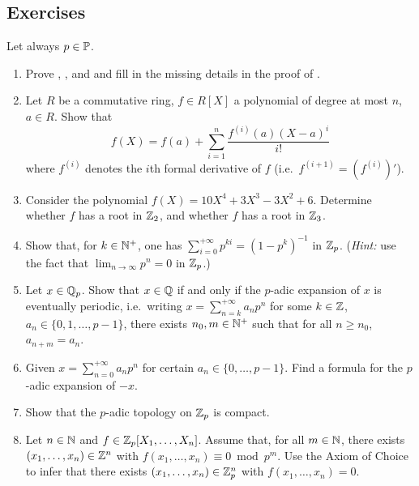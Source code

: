 \documentclass[12pt, leqno, british]{amsart}
\begin{document}
\subsection{Exercises}
Let always $p \in \mathbb P$.
\begin{enumerate}
\item Prove , , and  and fill in the missing details in the proof of .
\item\label{ex:formal-Taylor} Let $R$ be a commutative ring, $f \in R[X]$ a polynomial of degree at most $n$, $a \in R$.
Show that
\begin{displaymath}
f(X) = f(a) + \sum_{i=1}^n \frac{f^{(i)}(a)(X-a)^i}{i!}
\end{displaymath}
where $f^{(i)}$ denotes the $i$th formal derivative of $f$ (i.e.~$f^{(i+1)} = (f^{(i)})'$).
\item Consider the polynomial $f(X) = 10X^4 + 3X^3 - 3X^2 + 6$.
Determine whether $f$ has a root in $\mathbb Z_2$, and whether $f$ has a root in $\mathbb Z_3$.
\item\label{ex:geometric-series} Show that, for $k \in \mathbb N^+$, one has $\sum_{i=0}^{+\infty} p^{ki} = (1-p^k)^{-1}$ in $\mathbb Z_p$. (\textit{Hint:} use the fact that $\lim_{n \to \infty} p^n = 0$ in $\mathbb Z_p$.)
\item\label{ex:p-adic-periodic} Let $x \in \mathbb Q_p$.
Show that $x \in \mathbb Q$ if and only if the $p$-adic expansion of $x$ is eventually periodic, i.e.~writing $x = \sum_{n=k}^{+\infty} a_np^n$ for some $k \in \mathbb Z$, $a_n \in \lbrace 0, 1, \ldots, p-1 \rbrace$, there exists $n_0, m \in \mathbb N^+$ such that for all $n \geq n_0$, $a_{n+m} = a_n$.
\item Given $x = \sum_{n=0}^{+\infty} a_np^n$ for certain $a_n \in \lbrace 0, \ldots, p-1\rbrace$.
Find a formula for the $p$-adic expansion of $-x$.
\item Show that the $p$-adic topology on $\mathbb Z_p$ is compact.
\item\label{ex:solution-patching} Let $n \in \mathbb N$ and $f \in \mathbb Z_p[X_1, \ldots, X_n]$.
Assume that, for all $m \in \mathbb N$, there exists $(x_1, \ldots, x_n) \in \mathbb Z^n$ with $f(x_1, \ldots, x_n) \equiv 0 \bmod p^m$.
Use the Axiom of Choice to infer that there exists $(x_1, \ldots, x_n) \in \mathbb Z_p^n$ with $f(x_1, \ldots, x_n) = 0$.
\end{enumerate}
\end{document}
